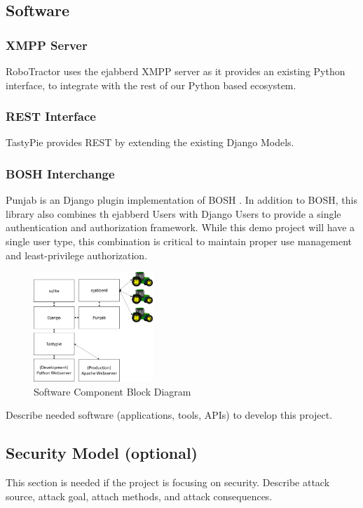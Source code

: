 \documentclass[conference,12pt]{IEEEtran}
\begin{document}
\subsection{Software}
\subsubsection{XMPP Server}
RoboTractor uses the ejabberd \autocite{_ejabberd} XMPP server as it provides an existing Python
interface, to integrate with the rest of our Python based ecosystem.
\subsubsection{REST Interface}
TastyPie provides REST \autocite{_toastdriven/django-tastypie_2014} by extending
the existing Django Models.
\subsubsection{BOSH Interchange}
Punjab is an Django plugin implementation of BOSH
\autocite{_twonds/punjab_2014}.  In addition to BOSH, this library also combines
th ejabberd Users with Django Users to provide a single authentication and
authorization framework. While this demo project will have a single user type,
this combination is critical to maintain proper use management and
least-privilege authorization.

\begin{figure}
\centering
\includegraphics[width=0.4\textwidth]{SoftwareComponentBlockDiagram.pdf}
\caption{Software Component Block Diagram}
\label{fig:softwarecomponents}
\end{figure}

Describe needed software (applications, tools, APIs) to develop this project.
\subsection{Security Model (optional)}
This section is needed if the project is focusing on security. Describe attack source, attack goal, attach methods, and attack consequences. 
\end{document}
